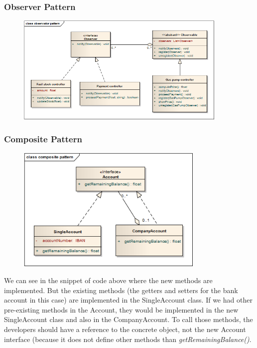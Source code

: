 \subsubsection{Observer Pattern}
\begin{figure}[H]
 \centering
 \includegraphics[width=0.9\textwidth]{../observatorPattern.png}
\end{figure}




\subsubsection{Composite Pattern}
\begin{figure}[H]
 \centering
 \includegraphics[width=0.8\textwidth]{../compositePattern.png}
\end{figure}



We can see in the snippet of code above where the new methods are implemented.
But the existing methods (the getters and setters for the bank account in this case) are implemented in the SingleAccount class.
If we had other pre-existing methods in the Account, they would be implemented in the new SingleAccount class and also in the CompanyAccount.
To call those methods, the developers should have a reference to the concrete object, not the new Account interface (because it does not define other methods than \textit{getRemainingBalance()}.
